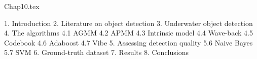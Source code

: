 Chap10.tex

1. Introduction
2. Literature on object detection
3. Underwater object detection
4. The algorithms
4.1 AGMM
4.2 APMM
4.3 Intrinsic model
4.4 Wave-back
4.5 Codebook
4.6 Adaboost
4.7 Vibe
5. Assessing detection quality
5.6 Naive Bayes
5.7 SVM
6. Ground-truth dataset
7. Results
8. Conclusions
